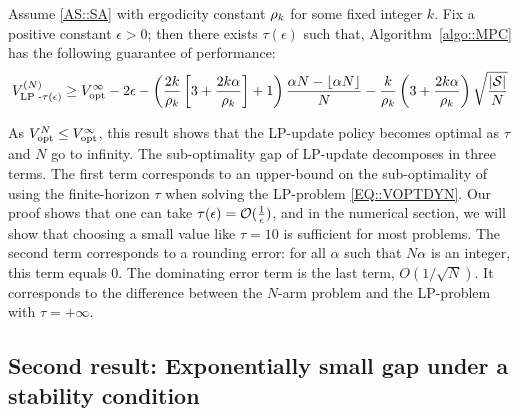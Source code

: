 \begin{theorem}
\label{thm:asymptotic_optimal}
    Assume \ref{AS::SA} with ergodicity constant $\rho_{k}$ for some fixed integer $k$. Fix a positive constant $\epsilon > 0$;  then there exists $\tau(\epsilon)$ such that, Algorithm~\ref{algo::MPC} has the following guarantee of performance:
    \begin{equation}
        \Vlp{\tau(\epsilon)}{N} \ge \Vopt{\infty} - 2\epsilon  - \left(\frac{2k}{\syncconst_k}\left[3 +  \frac{2k\alpha}{\syncconst_k}\right] + 1\right)\frac{\alpha N - \lfloor{\alpha N}\rfloor}{N} - \frac{k}{\syncconst_k}\left(3 +  \frac{2k\alpha}{\syncconst_k}\right)%
        \sqrt{\frac{|\mcl{S}|}{N}}%
    \end{equation}
\end{theorem}
As $V_{\text{opt}}^{N}\le V_{\text{opt}}^{\infty}$, this result shows that the LP-update policy becomes optimal as $\tau$ and $N$ go to infinity. The sub-optimality gap of LP-update decomposes in three terms. The first term corresponds to an upper-bound on the sub-optimality of using the finite-horizon $\tau$ when solving the LP-problem \eqref{EQ::VOPTDYN}. Our proof shows that one can take $\tau(\epsilon) = \mathcal{O}(\frac{1}{\epsilon})$, and in the numerical section, we will show that choosing a small value like $\tau=10$ is sufficient for most problems. The second term corresponds to a rounding error: for all $\alpha$ such that $N\alpha $ is an integer, this term equals $0$.  The dominating error term is the last term, $O(1/\sqrt{N})$. It corresponds to the difference between the $N$-arm problem and the LP-problem with $\tau=+\infty$. 

\subsection{Second result: Exponentially small gap under a stability condition}

